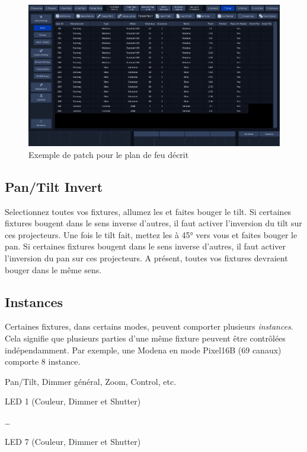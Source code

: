\begin{figure}[H]
    \centering
    \includegraphics[width=\textwidth]{3 - Encoder la Chimp/Images/patch.jpg}
    \caption{Exemple de patch pour le plan de feu décrit}
    \label{fig:exemple_patch}
\end{figure}

\subsection{Pan/Tilt Invert}
\label{subsec:prep_invert}

Selectionnez toutes vos fixtures, allumez les et faites bouger le tilt.
Si certaines fixtures bougent dans le sens inverse d'autres, il faut activer l'inversion du tilt sur ces projecteurs.
Une fois le tilt fait, mettez les à 45° vers vous et faites bouger le pan.
Si certaines fixtures bougent dans le sens inverse d'autres, il faut activer l'inversion du pan sur ces projecteurs.
\newline
\newline
A présent, toutes vos fixtures devraient bouger dans le même sens.

\subsection{Instances}
\label{subsec:prep_instances}

Certaines fixtures, dans certains modes, peuvent comporter plusieurs \textit{instances}. Cela signifie que plusieurs parties d'une même fixture peuvent être contrôlées indépendamment.
\newline
Par exemple, une Modena en mode Pixel16B (69 canaux) comporte 8 instance.
\begin{list}{-}{}
    \item Pan/Tilt, Dimmer général, Zoom, Control, etc.
    \item LED 1 (Couleur, Dimmer et Shutter)
    \item \dots
    \item LED 7 (Couleur, Dimmer et Shutter)
\end{list}

